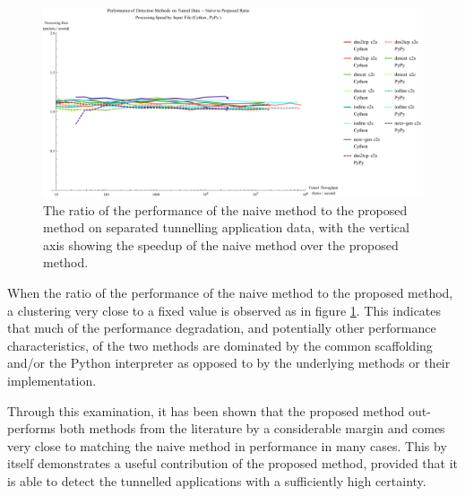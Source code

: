 \documentclass[12pt]{report}
\theoremstyle{remark}
\theoremstyle{definition}
\theoremstyle{definition}
\theoremstyle{definition}
\begin{document}
\begin{figure}
\centering
\includegraphics[width=\textwidth]{figures/ppia-naive2proposed.pdf}
\caption[Performance Ratio of the Naive Method to the Proposed Method on Tunnel
Data by Python Interpreter]{The ratio of the performance of the naive method to
the proposed method on separated tunnelling application data, with the vertical
axis showing the speedup of the naive method over the proposed method.}
\label{ppia-naive2proposed}
\end{figure}

When the ratio of the performance of the naive method to the proposed method, a
clustering very close to a fixed value is observed as in figure
\ref{ppia-naive2proposed}. This indicates that much of the performance
degradation, and potentially other performance characteristics, of the two methods
are dominated by the common scaffolding and/or the Python interpreter as opposed to by the underlying methods or
their implementation.

Through this examination, it has been shown that the proposed method
out-performs both methods from the literature by a considerable margin and comes
very close to matching the naive method in performance in many cases. This by
itself demonstrates a useful contribution of the proposed method, provided that
it is able to detect the tunnelled applications with a sufficiently high
certainty.
\end{document}
